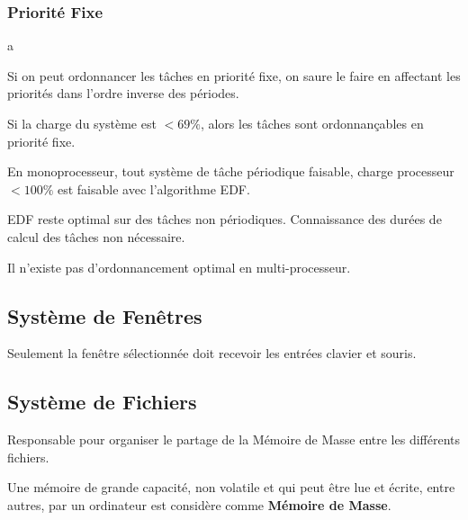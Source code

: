 \documentclass{article}
\begin{document}
\subsubsection{Priorité Fixe}
\begin{definition}
    a
    \begin{theorem}
        Si on peut ordonnancer les tâches en priorité fixe, on saure le faire en affectant les priorités dans l'ordre inverse des périodes.
    \end{theorem}

    \begin{theorem}
        Si la charge du système est $<69\%$, alors les tâches sont ordonnançables en priorité fixe.
    \end{theorem}

    \begin{theorem}
        En monoprocesseur, tout système de tâche périodique faisable, charge processeur $<100\%$ est faisable avec l'algorithme EDF.

        \begin{remark}
            EDF reste optimal sur des tâches non périodiques. Connaissance des durées de calcul des tâches non nécessaire.
        \end{remark}

        \begin{phrase}
            Il n'existe pas d'ordonnancement optimal en multi-processeur.
        \end{phrase}
    \end{theorem}
\end{definition}


\subsection{Système de Fenêtres}
\begin{definition}\label{def:systemeFenetres}
    Seulement la fenêtre sélectionnée doit recevoir les entrées clavier et souris.
\end{definition}

\subsection{Système de Fichiers}
\begin{definition}\label{def:systemeFichiers}
    Responsable pour organiser le partage de la Mémoire de Masse entre les différents fichiers.

    \begin{remark}
        Une mémoire de grande capacité, non volatile et qui peut être lue et écrite, entre autres, par un ordinateur est considère comme \textbf{Mémoire de Masse}.
    \end{remark}
\end{definition}
\end{document}
